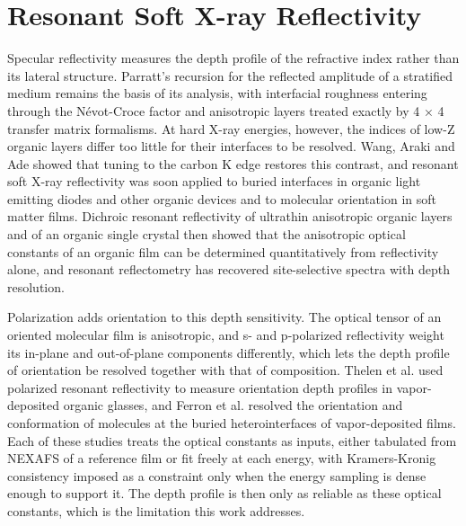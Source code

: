 \section{Resonant Soft X-ray Reflectivity}\label{sec:resonant-soft-x-ray-reflectivity}

Specular reflectivity measures the depth profile of the refractive index rather than its lateral structure. Parratt's recursion for the reflected amplitude of a stratified medium remains the basis of its analysis\autocite{parrattSurfaceStudiesSolids1954}, with interfacial roughness entering through the Névot-Croce factor\autocite{nevotCaracterisationSurfacesPar1980} and anisotropic layers treated exactly by 4 × 4 transfer matrix formalisms.\autocite{berremanOpticsStratifiedAnisotropic1972,yehOpticsAnisotropicLayered1980,passlerGeneralized442017} At hard X-ray energies, however, the indices of low-Z organic layers differ too little for their interfaces to be resolved. Wang, Araki and Ade showed that tuning to the carbon K edge restores this contrast\autocite{wangSoftXrayResonant2005}, and resonant soft X-ray reflectivity was soon applied to buried interfaces in organic light emitting diodes and other organic devices\autocite{wangMultilayerPolymerLight2008,hexemerD74OrganicLed2007} and to molecular orientation in soft matter films.\autocite{mezgerMolecularOrientationSoft2011} Dichroic resonant reflectivity of ultrathin anisotropic organic layers and of an organic single crystal then showed that the anisotropic optical constants of an organic film can be determined quantitatively from reflectivity alone,\autocite{capelliQuantitativeResonantSoft2019,pasqualiStructuralElectronicProperties2014a,capelliQuantitativeResonantSoft2016a} and resonant reflectometry has recovered site-selective spectra with depth resolution\autocite{hamann-borreroSiteselectiveSpectroscopyDepth2017}.

Polarization adds orientation to this depth sensitivity. The optical tensor of an oriented molecular film is anisotropic, and s- and p-polarized reflectivity weight its in-plane and out-of-plane components differently, which lets the depth profile of orientation be resolved together with that of composition. Thelen et al. used polarized resonant reflectivity to measure orientation depth profiles in vapor-deposited organic glasses, and Ferron et al. resolved the orientation and conformation of molecules at the buried heterointerfaces of vapor-deposited films.\autocite{ferronCompositionDictatesMolecular2023,thelenMolecularOrientationDepth2020,ferronCharacterizationInterfacialOrientation2022} Each of these studies treats the optical constants as inputs, either tabulated from NEXAFS of a reference film or fit freely at each energy, with Kramers-Kronig consistency imposed as a constraint only when the energy sampling is dense enough to support it.\autocite{kuzmenkoKramersKronigConstrained2005,stoneKramersKronigConstrainedModeling2012} The depth profile is then only as reliable as these optical constants, which is the limitation this work addresses.

